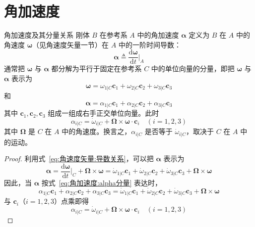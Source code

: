 \section{角加速度}
\begin{myTheorem}{角加速度及其分量关系}
刚体 $B$ 在参考系 $A$ 中的角加速度 $\bm{\alpha}$ 定义为 $B$ 在 $A$ 中的角速度 $\bm{\omega}$（见角速度矢量一节）在 $A$ 中的一阶时间导数：
\begin{equation}
    \bm{\alpha} \triangleq \frac{\mathrm{d}\bm{\omega}}{\mathrm{d}t}\Big|_{A}
    \label{eq:角加速度:定义}
\end{equation}
通常把 $\bm{\omega}$ 与 $\bm{\alpha}$ 都分解为平行于固定在参考系 $C$ 中的单位向量的分量，即把 $\bm{\omega}$ 与 $\bm{\alpha}$ 表示为
\begin{equation}
    \bm{\omega} = \omega_{1|C}\mathbf{c}_1+\omega_{2|C}\mathbf{c}_2+\omega_{3|C}\mathbf{c}_3
    \label{eq:角加速度:omega分量}
\end{equation}
和
\begin{equation}
    \bm{\alpha} = \alpha_{1|C}\mathbf{c}_1+\alpha_{2|C}\mathbf{c}_2+\alpha_{3|C}\mathbf{c}_3
    \label{eq:角加速度:alpha分量}
\end{equation}
其中 $\mathbf{c}_1,\mathbf{c}_2,\mathbf{c}_3$ 组成一组成右手正交单位向量。此时
\begin{equation}
    \alpha_{i|C} = \dot{\omega}_{i|C} + \bm{\Omega}\times\bm{\omega}\cdot\mathbf{c}_i \quad (i=1,2,3)
    \label{eq:角加速度:分量关系}
\end{equation}
其中 $\bm{\Omega}$ 是 $C$ 在 $A$ 中的角速度。换言之，$\alpha_{i|C}$ 是否等于 $\dot{\omega}_{i|C}$，取决于 $C$ 在 $A$ 中的运动。
\end{myTheorem}

\begin{proof}
    利用式~\eqref{eq:角速度矢量:导数关系}，可以把 $\bm{\alpha}$ 表示为
    \begin{equation}
        \bm{\alpha} = \frac{\mathrm{d}\bm{\omega}}{\mathrm{d}t}\Big|_{C} + \bm{\Omega}\times\bm{\omega}
        = \dot{\omega}_{1|C}\mathbf{c}_1+\dot{\omega}_{2|C}\mathbf{c}_2+\dot{\omega}_{3|C}\mathbf{c}_3 + \bm{\Omega}\times\bm{\omega}
    \end{equation}
    因此，当 $\bm{\alpha}$ 按式~\eqref{eq:角加速度:alpha分量} 表达时，
    \begin{equation}
        \alpha_{1|C}\mathbf{c}_1+\alpha_{2|C}\mathbf{c}_2+\alpha_{3|C}\mathbf{c}_3
        = \dot{\omega}_{1|C}\mathbf{c}_1+\dot{\omega}_{2|C}\mathbf{c}_2+\dot{\omega}_{3|C}\mathbf{c}_3 + \bm{\Omega}\times\bm{\omega}
    \end{equation}
    与 $\mathbf{c}_i$（$i=1,2,3$）点乘即得
    \begin{equation}
        \alpha_{i|C} = \dot{\omega}_{i|C} + \bm{\Omega}\times\bm{\omega}\cdot\mathbf{c}_i \quad (i=1,2,3)
    \end{equation}
\end{proof}

